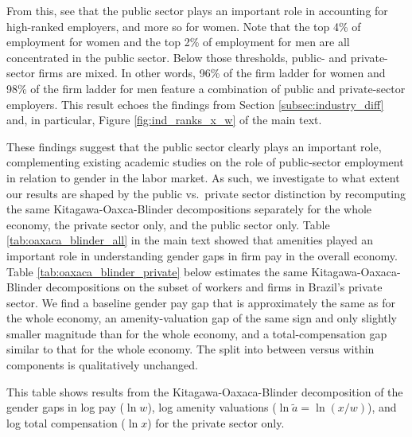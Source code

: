 From this, see that the public sector plays an important role in accounting for high-ranked employers, and more so for women. Note that the top 4\% of employment for women and the top 2\% of employment for men are all concentrated in the public sector. Below those thresholds, public- and private-sector firms are mixed. In other words, 96\% of the firm ladder for women and 98\% of the firm ladder for men feature a combination of public and private-sector employers. This result echoes the findings from Section \ref{subsec:industry_diff} and, in particular, Figure \ref{fig:ind_ranks_x_w} of the main text.

These findings suggest that the public sector clearly plays an important role, complementing existing academic studies on the role of public-sector employment in relation to gender in the labor market. As such, we investigate to what extent our results are shaped by the public vs.\ private sector distinction by recomputing the same Kitagawa-Oaxca-Blinder decompositions separately for the whole economy, the private sector only, and the public sector only. Table \ref{tab:oaxaca_blinder_all} in the main text showed that amenities played an important role in understanding gender gaps in firm pay in the overall economy. Table \ref{tab:oaxaca_blinder_private} below estimates the same Kitagawa-Oaxaca-Blinder decompositions on the subset of workers and firms in Brazil's private sector. We find a baseline gender pay gap that is approximately the same as for the whole economy, an amenity-valuation gap of the same sign and only slightly smaller magnitude than for the whole economy, and a total-compensation gap similar to that for the whole economy. The split into between versus within components is qualitatively unchanged.

%
\begin{table}[htbp!]
    \caption{Kitagawa-Oaxaca-Blinder decompositions---private sector only}
    \label{tab:oaxaca_blinder_private}
    \resizebox{\textwidth}{!}{%
    
    }
    \begin{tablenotes}
        \footnotesize
        This table shows results from the Kitagawa-Oaxaca-Blinder decomposition of the gender gaps in log pay ($\ln w$), log amenity valuations ($\ln \tilde{a} = \ln(x/w)$), and log total compensation ($\ln x$) for the private sector only. %
    \end{tablenotes}
    \begin{tablenotes}[Source]
        \sourcemodel%
    \end{tablenotes}
\end{table}
%

